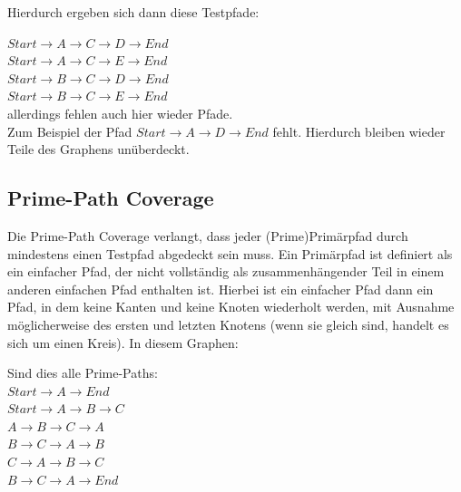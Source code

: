 Hierdurch ergeben sich dann diese Testpfade:

$Start \rightarrow  A \rightarrow  C \rightarrow  D \rightarrow  End$ \\
$Start \rightarrow  A \rightarrow  C \rightarrow  E \rightarrow  End$ \\
$Start \rightarrow  B \rightarrow  C \rightarrow  D \rightarrow  End$ \\
$Start \rightarrow  B \rightarrow  C \rightarrow  E \rightarrow  End$ \\

allerdings fehlen auch hier wieder Pfade. \\
Zum Beispiel der Pfad $Start \rightarrow A \rightarrow D \rightarrow End$ fehlt.
Hierdurch bleiben wieder Teile des Graphens unüberdeckt.

\subsection{Prime-Path Coverage}

Die Prime-Path Coverage verlangt, dass jeder (Prime)Primärpfad durch mindestens einen Testpfad abgedeckt sein muss.
Ein Primärpfad ist definiert als ein einfacher Pfad, der nicht vollständig als zusammenhängender Teil in einem anderen einfachen Pfad enthalten ist. \cite[vgl. S. 35]{software-testing}
Hierbei ist ein einfacher Pfad dann  ein Pfad, in dem keine Kanten und keine Knoten wiederholt werden,
mit Ausnahme möglicherweise des ersten und letzten Knotens (wenn sie gleich sind, handelt es sich um einen Kreis).
In diesem Graphen:


Sind dies alle Prime-Paths: \\

$ Start \rightarrow  A \rightarrow  End$ \\
$ Start \rightarrow A \rightarrow B \rightarrow C$ \\
$ A \rightarrow B \rightarrow C \rightarrow A $ \\
$ B \rightarrow C \rightarrow A \rightarrow B $ \\
$ C \rightarrow A \rightarrow B \rightarrow C $ \\
$ B \rightarrow C \rightarrow A \rightarrow End $ \\

